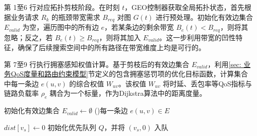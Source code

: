 \documentclass[print, master, vlined]{DissertUESTC}
\begin{document}
   第 1至6 行对应拓扑剪枝阶段。在时刻 \( t \)，GEO控制器获取全局拓扑状态，首先根据业务请求 \( R_k \) 的瓶颈带宽需求 \( B_{req} \) 对图 \( G(t) \) 进行预处理。初始化有效边集合 \( E_{valid} \) 为空，遍历图中的所有边 \( e \)，若某条边的剩余带宽 \( B_e(t) < B_{req} \)，则将其忽略；反之，若 \( B_e(t) \ge B_{req} \)，则将其加入 \( E_{valid} \)。这一步利用带宽的凹性特征，确保了后续搜索空间中的所有路径在带宽维度上均是可行的。
    
    第 7至9 行执行拥塞感知权值计算。基于剪枝后的有效边集合 \( E_{valid} \)，利用\ref{sec: 业务QoS度量和路由约束模型}节定义的包含拥塞惩罚项的优化目标函数，计算集合中每一条边 \( e(u,v) \) 的综合权值 \( W_{uv} \)。该权值 \( W_{uv} \) 将时延、丢包率等QoS指标与链路负载率 \( \rho_e \) 耦合为一个标量，作为Dijkstra算法中的距离度量。
    \begin{algorithm}[!htbp]
      \caption{域间路由算法}
      \label{alg: 域间路由算法}
    
    
      初始化有效边集合 $E_{valid} \leftarrow \emptyset$\;
      \For(){每一条边 $e(u, v) \in E$}{
      }
    
    
      $dist[v_s] \leftarrow 0$\;
      初始化优先队列 $Q$，并将 $(v_s, 0)$ 入队\;
    

\end{algorithm}
\end{document}
